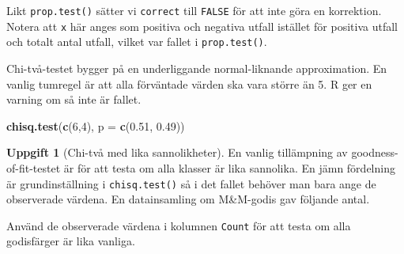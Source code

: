 \documentclass[
]{book}
\newenvironment{Shaded}{\begin{snugshade}}{\end{snugshade}}
\newcommand{\AttributeTok}[1]{\textcolor[rgb]{0.13,0.29,0.53}{#1}}
\newcommand{\DecValTok}[1]{\textcolor[rgb]{0.00,0.00,0.81}{#1}}
\newcommand{\FloatTok}[1]{\textcolor[rgb]{0.00,0.00,0.81}{#1}}
\newcommand{\FunctionTok}[1]{\textcolor[rgb]{0.13,0.29,0.53}{\textbf{#1}}}
\newcommand{\NormalTok}[1]{#1}
\newcommand{\OtherTok}[1]{\textcolor[rgb]{0.56,0.35,0.01}{#1}}
\newcommand{\SpecialCharTok}[1]{\textcolor[rgb]{0.81,0.36,0.00}{\textbf{#1}}}
\newcommand{\StringTok}[1]{\textcolor[rgb]{0.31,0.60,0.02}{#1}}
\theoremstyle{definition}
\theoremstyle{definition}
\theoremstyle{definition}
\newtheorem{exercise}{Uppgift}[chapter]
\theoremstyle{definition}
\theoremstyle{remark}
\begin{document}
Likt \texttt{prop.test()} sätter vi \texttt{correct} till \texttt{FALSE} för att inte göra en korrektion. Notera att \texttt{x} här anges som positiva och negativa utfall istället för positiva utfall och totalt antal utfall, vilket var fallet i \texttt{prop.test()}.

Chi-två-testet bygger på en underliggande normal-liknande approximation. En vanlig tumregel är att alla förväntade värden ska vara större än 5. R ger en varning om så inte är fallet.

\begin{Shaded}
\begin{Highlighting}[]
\FunctionTok{chisq.test}\NormalTok{(}\FunctionTok{c}\NormalTok{(}\DecValTok{6}\NormalTok{,}\DecValTok{4}\NormalTok{), }\AttributeTok{p =} \FunctionTok{c}\NormalTok{(}\FloatTok{0.51}\NormalTok{, }\FloatTok{0.49}\NormalTok{))}
\end{Highlighting}
\end{Shaded}

\begin{exercise}[Chi-två med lika sannolikheter]
En vanlig tillämpning av goodness-of-fit-testet är för att testa om alla klasser är lika sannolika. En jämn fördelning är grundinställning i \texttt{chisq.test()} så i det fallet behöver man bara ange de observerade värdena. En datainsamling om M\&M-godis gav följande antal.

\begin{Shaded}
\end{Shaded}

Använd de observerade värdena i kolumnen \texttt{Count} för att testa om alla godisfärger är lika vanliga.
\end{exercise}
\end{document}
